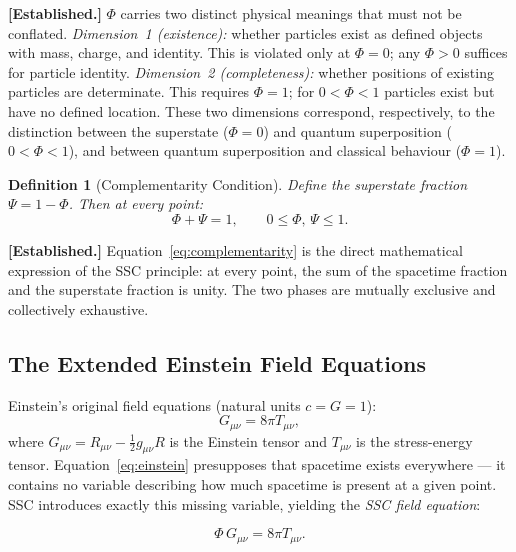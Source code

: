 \documentclass[12pt,a4paper]{article}
\newtheorem{definition}{Definition}
\begin{document}
\textbf{[Established.]} $\Phi$ carries two distinct physical
meanings that must not be conflated.
\emph{Dimension~1 (existence):} whether particles exist as defined
objects with mass, charge, and identity. This is violated only at
$\Phi = 0$; any $\Phi > 0$ suffices for particle identity.
\emph{Dimension~2 (completeness):} whether positions of existing
particles are determinate. This requires $\Phi = 1$; for
$0 < \Phi < 1$ particles exist but have no defined location.
These two dimensions correspond, respectively, to the distinction
between the superstate ($\Phi = 0$) and quantum superposition
($0 < \Phi < 1$), and between quantum superposition and classical
behaviour ($\Phi = 1$).

\begin{definition}[Complementarity Condition]
\label{def:complementarity}
Define the superstate fraction $\Psi = 1 - \Phi$. Then at every
point:
\begin{equation}
  \Phi + \Psi = 1, \qquad 0 \leq \Phi,\, \Psi \leq 1.
  \label{eq:complementarity}
\end{equation}
\end{definition}

\textbf{[Established.]} Equation~\eqref{eq:complementarity} is the
direct mathematical expression of the SSC principle: at every point,
the sum of the spacetime fraction and the superstate fraction is
unity. The two phases are mutually exclusive and collectively
exhaustive.

\subsection{The Extended Einstein Field Equations}

Einstein's original field equations (natural units $c = G = 1$):
\begin{equation}
  G_{\mu\nu} = 8\pi T_{\mu\nu},
  \label{eq:einstein}
\end{equation}
where $G_{\mu\nu} = R_{\mu\nu} - \tfrac{1}{2}g_{\mu\nu}R$ is the
Einstein tensor and $T_{\mu\nu}$ is the stress-energy tensor.
Equation~\eqref{eq:einstein} presupposes that spacetime exists
everywhere — it contains no variable describing how much spacetime
is present at a given point. SSC introduces exactly this missing
variable, yielding the \emph{SSC field equation}:

\begin{equation}
  \boxed{\Phi\,G_{\mu\nu} = 8\pi T_{\mu\nu}.}
  \label{eq:ssc_field}
\end{equation}
\end{document}
